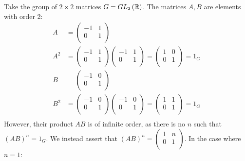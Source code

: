 \documentclass{article}
\begin{document}
Take the group of $2 \times 2$ matrices $G = GL_2\left(\mathbb{R}\right)$. The matrices $A, B$ are elements with order 2:
\begin{equation}
    \begin{split}
        A & = \begin{pmatrix}
            -1 & 1 \\ 0 & 1 \\
        \end{pmatrix} \\
        A^2 & = \begin{pmatrix}
            -1 & 1 \\ 0 & 1 \\
        \end{pmatrix} \begin{pmatrix}
            -1 & 1 \\ 0 & 1 \\
        \end{pmatrix} = \begin{pmatrix}
            1 & 0 \\ 0 & 1 \\
        \end{pmatrix} = 1_{G} \\
        B & = \begin{pmatrix}
            -1 & 0 \\ 0 & 1 \\
        \end{pmatrix} \\
        B^2 & = \begin{pmatrix}
            -1 & 0 \\ 0 & 1 \\
        \end{pmatrix} \begin{pmatrix}
            -1 & 0 \\ 0 & 1 \\
        \end{pmatrix} = \begin{pmatrix}
            1 & 1 \\ 0 & 1 \\
        \end{pmatrix} = 1_{G} \\
    \end{split}
\end{equation}
However, their product $AB$ is of infinite order, as there is no $n$ such that $\left(AB\right)^n = 1_{G}$. We instead assert that $\left(AB\right)^n = \begin{pmatrix} 1 & n \\ 0 & 1 \\ \end{pmatrix}$. In the case where $n = 1$:
\end{document}
